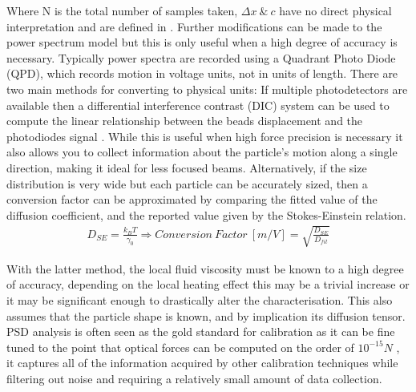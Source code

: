 Where N is the total number of samples taken, $\Delta x \ \& \ c$ 
have no direct physical interpretation and are defined in 
\cite{BergSoerensen2004}. Further modifications can be made to the 
power spectrum model but this is only useful when a high degree of 
accuracy is necessary. Typically power spectra are recorded using 
a Quadrant Photo Diode (QPD), which records motion in voltage units, 
not in units of length. There are two main methods for converting to
physical units: If multiple photodetectors are available then a 
differential interference contrast (DIC) system can be used to 
compute the linear relationship between the beads displacement and 
the photodiodes signal \cite{Capitanio2002}. While this is useful 
when high force precision is necessary it also allows you to collect information about the particle's motion along a single direction, 
making it ideal for less focused beams. Alternatively, if the size distribution is very wide but each particle can be accurately sized, 
then a conversion factor can be approximated by comparing the fitted 
value of the diffusion coefficient, and the reported value given by 
the Stokes-Einstein relation.
\begin{align}
	\label{eq:conversion_factor}
	D_{SE} = \frac{k_BT}{\gamma_0} \Rightarrow Conversion\ Factor \ [m/V]= \sqrt{\frac{D_{SE}}{D_{fit}}}
\end{align}

With the latter method, the local fluid viscosity must be known to a 
high degree of accuracy, depending on the local heating effect this 
may be a trivial increase or it may be significant enough to drastically 
alter the characterisation. This also assumes that the particle shape is known, and by implication its diffusion tensor. PSD analysis is often seen as the gold standard for calibration as it can be fine tuned to the point that optical forces can be computed on the order of $10^{-15} N$ 
\cite{BergSoerensen2004}, it captures all of the information acquired 
by other calibration techniques while filtering out noise and requiring 
a relatively small amount of data collection. 

